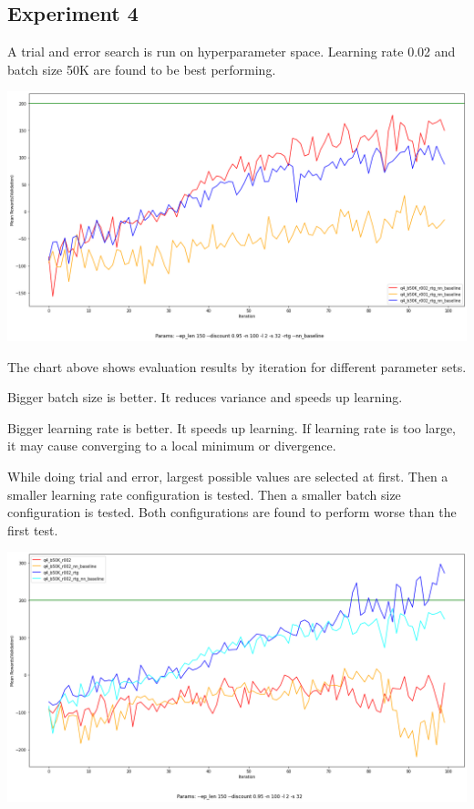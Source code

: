 \documentclass[11pt]{article}
\begin{document}
    \subsection{Experiment 4}

    A trial and error search is run on hyperparameter space.
    Learning rate 0.02 and batch size 50K are found to be best performing.

    \hspace*{-0.75in}
    \includegraphics[scale=0.35]{q4/q4_parameter_comparison}

    The chart above shows evaluation results by iteration for different parameter sets.

    Bigger batch size is better.
    It reduces variance and speeds up learning.

    Bigger learning rate is better.
    It speeds up learning.
    If learning rate is too large, it may cause converging to a local minimum or divergence.

    While doing trial and error, largest possible values are selected at first.
    Then a smaller learning rate configuration is tested.
    Then a smaller batch size configuration is tested.
    Both configurations are found to perform worse than the first test.

    \hspace*{-0.75in}
    \includegraphics[scale=0.35]{q4/q4_rtg_baseline_comparison}
\end{document}
